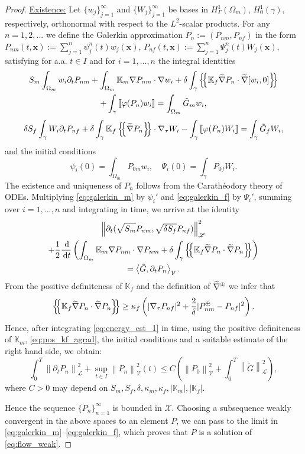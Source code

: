 \documentclass[a4paper]{article}
\numberwithin{equation}{section}
\def\agrad{\widetilde\nabla}
\def\avg#1{\left\{\mskip-5mu\left\{#1\right\}\mskip-5mu\right\}}
\def\d {\,{\rm d}}
\def\ddt#1{\frac{\d #1}{\d t}}
\def\dt{\prtl_t}
\def\dual#1#2{\left\langle #1,#2\right\rangle}
\def\Hf{\mathscr{L}} %
\def\jmp#1{\left\llbracket #1 \right\rrbracket}
\def\norm#1{\left\|#1\right\|}
\def\pphi{{\varphi}}
\def\prtl{\partial}
\def\tn#1{{\mathbb{#1}}}    %
\def\Vf{{\mathcal V}} %
\def\vc#1{\mathbf{#1}}     %
\def\xx{\vc x}
\newcommand{\opm}{
  {\mathbin{
    \mathchoice
      {\buildcirclepm{\displaystyle     }{0.14ex}{0.95}{0.05ex}{.7}}
      {\buildcirclepm{\textstyle        }{0.14ex}{0.95}{0.05ex}{.7}}
      {\buildcirclepm{\scriptstyle      }{0.13ex}{0.955}{0.04ex}{.55}}
      {\buildcirclepm{\scriptscriptstyle}{0.08ex}{0.95}{0.03ex}{.45}}
  }} 
}
\newcommand\buildcirclepm[5]{%
  \begin{tikzpicture}[baseline=(X.base), inner sep=-#5, outer sep=-.65]
    \node[draw,circle,line width=#4] (X)  {\footnotesize\raisebox{#2}{\scalebox{#3}{$#1\pm$}}};
  \end{tikzpicture}%
}
\newcommand{\eq}[1]{\begin{equation}#1\end{equation}}
\newcommand{\eqs}[1]{\begin{equation*}#1\end{equation*}}
\newcommand{\ml}[1]{\begin{multline}#1\end{multline}}
\begin{document}
\begin{proof}
\underline{Existence:}
Let $\{w_j\}_{j=1}^\infty$ and $\{W_j\}_{j=1}^\infty$ be bases in $H^1_\Gamma(\Omega_m)$, $H^1_0(\gamma)$, respectively, orthonormal with respect to the $L^2$-scalar products.
For any $n=1,2,...$ we define the Galerkin approximation $P_n:=(P_{nm},P_{nf})$ in the form $P_{nm}(t,\xx):=\sum_{j=1}^n\psi_j^n(t)w_j(\xx)$, $P_{nf}(t,\xx):=\sum_{j=1}^n\Psi_j^n(t)W_j(\xx)$, satisfying for a.a. $t\in I$ and for $i=1,...,n$ the integral identities
\ml{ \label{eq:galerkin_m} S_m\int_{\Omega_m}w_i\dt P_{nm} + \int_{\Omega_m}\tn K_m\nabla P_{nm}\cdot\nabla w_i + \delta\int_\gamma\avg{\tn K_f\agrad P_n\cdot\agrad[w_i,0]}\\
+ \int_\gamma\jmp{\pphi(P_n) w_i} = \int_{\Omega_m}\tilde G_m w_i, }
\eq{ \label{eq:galerkin_f} \delta S_f\int_\gamma W_i\dt P_{nf} + \delta\int_\gamma\tn K_f\avg{\agrad P_n}\cdot\nabla_\tau W_i - \int_\gamma\jmp{\pphi(P_n)W_i} = \int_\gamma \tilde G_f W_i, }
and the initial conditions
\eqs{ \psi_i(0)=\int_{\Omega_m}P_{0m}w_i, \quad \Psi_i(0)=\int_\gamma P_{0f}W_i. }
The existence and uniqueness of $P_n$ follows from the Carath\'eodory theory of ODEs.
Multiplying \eqref{eq:galerkin_m} by $\psi_i'$ and \eqref{eq:galerkin_f} by $\Psi_i'$, summing over $i=1,...,n$ and integrating in time, we arrive at the identity
\ml{\label{eq:energy_est_1} \norm{\dt(\sqrt{S_m} P_{nm},\sqrt{\delta S_f} P_{nf})}_\Hf^2\\
+ \frac12\ddt{}\left(\int_{\Omega_m}\tn K_m\nabla P_{nm} \cdot\nabla P_{nm}
+ \delta\int_\gamma\avg{\tn K_f\agrad P_n\cdot\agrad P_n}\right)\\
= \dual{\tilde G}{\dt P_n}_\Vf. }
From the positive definiteness of $\tn K_f$ and the definition of $\agrad^\opm$ we infer that
\eq{ \label{eq:pos_kf_agrad} \avg{\tn K_f\agrad P_n\cdot\agrad P_n} \ge \kappa_f\left(|\nabla_\tau P_{nf}|^2 + \frac2\delta|P_{nm}^\opm-P_{nf}|^2\right). }
Hence, after integrating \eqref{eq:energy_est_1} in time, using the positive definiteness of $\tn K_m$, \eqref{eq:pos_kf_agrad}, the initial conditions and a suitable estimate of the right hand side, we obtain:
\eq{ \label{eq:energy_est_flow} \int_0^T\norm{\dt P_n}_\Hf^2 + \sup_{t\in I}\norm{P_n}_\Vf^2(t) \le C\left(\norm{P_0}_\Vf^2 + \int_0^T\norm{\tilde G}_{\Hf}^2\right), }
where $C>0$ may depend on $S_m,S_f,\delta,\kappa_m,\kappa_f,|\tn K_m|,|\tn K_f|$.

Hence the sequence $\{P_n\}_{n=1}^\infty$ is bounded in $\mathcal X$.
Choosing a subsequence weakly convergent in the above spaces to an element $P$, we can pass to the limit in \eqref{eq:galerkin_m}--\eqref{eq:galerkin_f}, which proves that $P$ is a solution of \eqref{eq:flow_weak}.


\end{proof}
\end{document}
